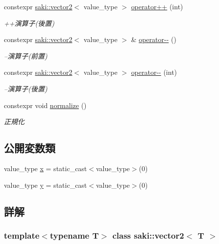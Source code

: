 \begin{DoxyCompactItemize}
constexpr \mbox{\hyperlink{classsaki_1_1vector2}{saki\+::vector2}}$<$ value\+\_\+type $>$ \mbox{\hyperlink{classsaki_1_1vector2_a04318d78cb10edb8a48d149254275a2b}{operator++}} (int)
\begin{DoxyCompactList}\small\item\em ++演算子(後置) \end{DoxyCompactList}\item 
constexpr \mbox{\hyperlink{classsaki_1_1vector2}{saki\+::vector2}}$<$ value\+\_\+type $>$ \& \mbox{\hyperlink{classsaki_1_1vector2_a89080c4aa884a4724db9a1a9928cf874}{operator-\/-\/}} ()
\begin{DoxyCompactList}\small\item\em --演算子(前置) \end{DoxyCompactList}\item 
constexpr \mbox{\hyperlink{classsaki_1_1vector2}{saki\+::vector2}}$<$ value\+\_\+type $>$ \mbox{\hyperlink{classsaki_1_1vector2_a22794cee08c50d6114ad4407c81b3d30}{operator-\/-\/}} (int)
\begin{DoxyCompactList}\small\item\em --演算子(後置) \end{DoxyCompactList}\item 
constexpr void \mbox{\hyperlink{classsaki_1_1vector2_a90907529f5891e7395e1253a95e7014d}{normalize}} ()
\begin{DoxyCompactList}\small\item\em 正規化 \end{DoxyCompactList}\end{DoxyCompactItemize}
\subsection*{公開変数類}
\begin{DoxyCompactItemize}
\item 
value\+\_\+type \mbox{\hyperlink{classsaki_1_1vector2_a8637207f0d001c6b44deb1834c29f5ad}{x}} = static\+\_\+cast$<$value\+\_\+type$>$(0)
\item 
value\+\_\+type \mbox{\hyperlink{classsaki_1_1vector2_a6275c229b3652cc2c4d88850507c5aea}{y}} = static\+\_\+cast$<$value\+\_\+type$>$(0)
\end{DoxyCompactItemize}


\subsection{詳解}
\subsubsection*{template$<$typename T$>$\newline
class saki\+::vector2$<$ T $>$}


